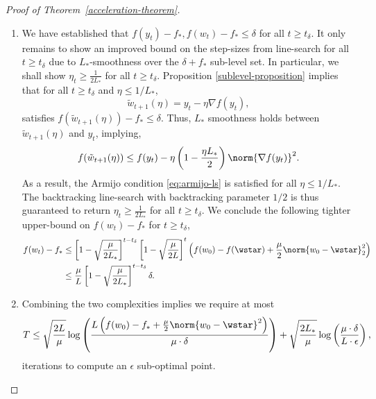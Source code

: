 \documentclass[10pt]{article} %
\newcommand{\yk}{y_t}
\newcommand{\wk}{w_t}
\newcommand{\etak}{\eta_{t}}
\newcommand{\fstar}{f_*}
\newcommand{\grad}{\nabla{} f}
\newcommand{\rbr}[1]{\left(#1\right)}
\newcommand{\sbr}[1]{\left[#1\right]}
\begin{document}
\begin{proof}[Proof of Theorem~\ref{acceleration-theorem}]
\begin{enumerate}
        \item
              We have established that \( f(\yk) - \fstar, f(\wk) - \fstar \leq \delta \)
              for all \( t \geq t_{\delta} \).
              It only remains to show an improved bound on the step-sizes from line-search
              for all \( t \geq t_{\delta} \) due to \( L_* \)-smoothness
              over the \( \delta + \fstar \) sub-level set.
              In particular, we shall show \( \etak \geq \frac{1}{2L_*} \) for all
              \( t \geq t_{\delta} \). Proposition \ref{sublevel-proposition} implies that for all \( t \geq t_\delta \) and \( \eta \leq 1 / L_* \),
              \[
                  \tilde{w}_{t+1}(\eta) = \yk - \eta \grad(\yk),
              \]
              satisfies \( f(\tilde{w}_{t+1}(\eta)) - \fstar \leq \delta \).
              Thus, \( L_* \) smoothness holds between \( \tilde{w}_{t+1}(\eta) \)
              and \( \yk \), implying,
              \[
                  f(\tilde{w}_{t+1}(\eta))
                  \leq f(\yk) - \eta\rbr{1 - \frac{\eta L_*}{2}} \norm{\grad(\yk)}^2.
              \]
              As a result, the Armijo condition \cref{eq:armijo-ls} is satisfied
              for all \( \eta \leq 1 / L_* \).
              The backtracking line-search with backtracking parameter \( 1/2 \)
              is thus guaranteed to return \( \etak \geq \frac{1}{2L_*} \) for all
              \( t \geq t_{\delta} \).
              We conclude the following tighter upper-bound on \( f(\wk) - \fstar \) for
              \( t \geq t_{\delta} \),
              \begin{align*}
                  f(\wk) - \fstar
                   & \leq \sbr{ 1 - \sqrt{\frac{\mu}{2L_*}}}^{t - t_\delta}
                  \sbr{1 - \sqrt{\frac{\mu}{2L}}}^{t} \rbr{f(w_0) - f(\wstar) +
                  \frac{\mu}{2} \norm{w_0 - \wstar}_2^2}                                  \\
                   & \leq \frac{\mu}{L} \sbr{ 1 - \sqrt{\frac{\mu}{2L_*}}}^{t - t_\delta}
                  \delta.
              \end{align*}

        \item Combining the two complexities implies we require at most
              \[
                  T \leq
                  \sqrt{\frac{2L}{\mu}}\log\rbr{\frac{L \rbr{f(w_0) - \fstar + \frac{\mu}{2}\norm{w_0 - \wstar}^2}}{\mu \cdot \delta}}
                  +
                  \sqrt{\frac{2L_*}{\mu}}\log\rbr{\frac{\mu \cdot \delta}{L \cdot \epsilon}},
              \]
              iterations to compute an \( \epsilon \) sub-optimal point.
    \end{enumerate}
\end{proof}
\end{document}
